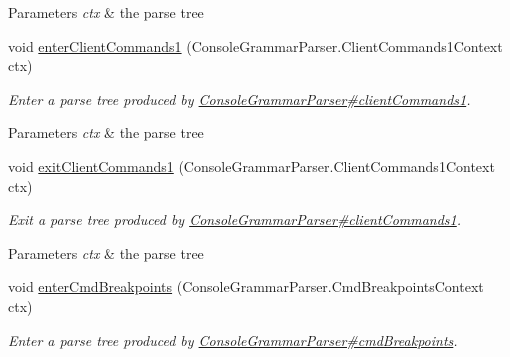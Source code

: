 \begin{DoxyCompactItemize}
\begin{DoxyCompactList}
\begin{DoxyParams}{Parameters}
{\em ctx} & the parse tree\\
\hline
\end{DoxyParams}
 \end{DoxyCompactList}\item 
void \hyperlink{classgov_1_1nasa_1_1jpf_1_1inspector_1_1client_1_1parser_1_1_console_grammar_base_listener_a7828a00c2e2197e33c29c2c363e58416}{enter\+Client\+Commands1} (Console\+Grammar\+Parser.\+Client\+Commands1\+Context ctx)
\begin{DoxyCompactList}\small\item\em Enter a parse tree produced by \hyperlink{classgov_1_1nasa_1_1jpf_1_1inspector_1_1client_1_1parser_1_1_console_grammar_parser_a0516a8d9423ed5170d4896713513569e}{Console\+Grammar\+Parser\#client\+Commands1}.


\begin{DoxyParams}{Parameters}
{\em ctx} & the parse tree\\
\hline
\end{DoxyParams}
 \end{DoxyCompactList}\item 
void \hyperlink{classgov_1_1nasa_1_1jpf_1_1inspector_1_1client_1_1parser_1_1_console_grammar_base_listener_a8b6b77524b120fd667944c6a7e7d09c4}{exit\+Client\+Commands1} (Console\+Grammar\+Parser.\+Client\+Commands1\+Context ctx)
\begin{DoxyCompactList}\small\item\em Exit a parse tree produced by \hyperlink{classgov_1_1nasa_1_1jpf_1_1inspector_1_1client_1_1parser_1_1_console_grammar_parser_a0516a8d9423ed5170d4896713513569e}{Console\+Grammar\+Parser\#client\+Commands1}.


\begin{DoxyParams}{Parameters}
{\em ctx} & the parse tree\\
\hline
\end{DoxyParams}
 \end{DoxyCompactList}\item 
void \hyperlink{classgov_1_1nasa_1_1jpf_1_1inspector_1_1client_1_1parser_1_1_console_grammar_base_listener_a8f531395ff1ff2c9adbdc48ff6126f84}{enter\+Cmd\+Breakpoints} (Console\+Grammar\+Parser.\+Cmd\+Breakpoints\+Context ctx)
\begin{DoxyCompactList}\small\item\em Enter a parse tree produced by \hyperlink{classgov_1_1nasa_1_1jpf_1_1inspector_1_1client_1_1parser_1_1_console_grammar_parser_a05e7399334460971133b1effabd14883}{Console\+Grammar\+Parser\#cmd\+Breakpoints}.



\end{DoxyCompactList}
\end{DoxyCompactItemize}

